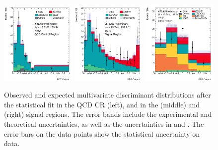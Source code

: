 \begin{figure}[!htbp]
\begin{center}
\includegraphics[width=0.325\textwidth]{figures/4l/BDT_4l_QCD_CR_postFit_v1.pdf}
\includegraphics[width=0.325\textwidth]{figures/4l/BDT_4l_SR_postFit_v1.pdf}
\includegraphics[width=0.325\textwidth]{figures/llvv/BDT_2l2v_SR_postFit_v1.pdf}\\
\end{center}
\caption{Observed and expected multivariate discriminant distributions after the statistical fit 
        in the \lllljj QCD CR (left), 
        and in the \lllljj (middle) and \llvvjj (right) signal regions.
        The error bands include the experimental and theoretical uncertainties, 
        as well as the uncertainties in \muEW and \muQCD.
        The error bars on the data points show the statistical uncertainty on data.
        }
\label{fig:MVA}
\end{figure}
